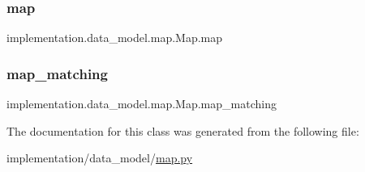 \subsubsection{\texorpdfstring{map}{map}}
{\footnotesize\ttfamily implementation.\+data\+\_\+model.\+map.\+Map.\+map}

\mbox{\label{classimplementation_1_1data__model_1_1map_1_1_map_a0a36c23f92da7063d8377fc83c373128}} 
\subsubsection{\texorpdfstring{map\+\_\+matching}{map\_matching}}
{\footnotesize\ttfamily implementation.\+data\+\_\+model.\+map.\+Map.\+map\+\_\+matching}



The documentation for this class was generated from the following file\+:\begin{DoxyCompactItemize}
\item 
implementation/data\+\_\+model/\hyperlink{map_8py}{map.\+py}\end{DoxyCompactItemize}
